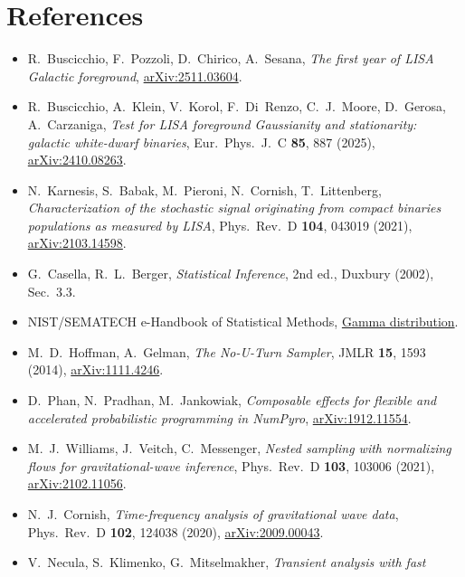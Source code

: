 \documentclass[11pt,a4paper]{article}
\begin{document}
\section*{References}
\begin{itemize}\sloppy
  \item R.~Buscicchio, F.~Pozzoli, D.~Chirico, A.~Sesana, \emph{The first year of LISA
        Galactic foreground},
        \href{https://arxiv.org/abs/2511.03604}{arXiv:2511.03604}.
  \item R.~Buscicchio, A.~Klein, V.~Korol, F.~Di~Renzo, C.~J.~Moore, D.~Gerosa,
        A.~Carzaniga, \emph{Test for LISA foreground Gaussianity and stationarity:
        galactic white-dwarf binaries}, Eur.\ Phys.\ J.\ C \textbf{85}, 887 (2025),
        \href{https://arxiv.org/abs/2410.08263}{arXiv:2410.08263}.
  \item N.~Karnesis, S.~Babak, M.~Pieroni, N.~Cornish, T.~Littenberg,
        \emph{Characterization of the stochastic signal originating from compact
        binaries populations as measured by LISA}, Phys.\ Rev.\ D \textbf{104},
        043019 (2021), \href{https://arxiv.org/abs/2103.14598}{arXiv:2103.14598}.
  \item G.~Casella, R.~L.~Berger, \emph{Statistical Inference}, 2nd ed., Duxbury (2002),
        Sec.~3.3.
  \item NIST/SEMATECH e-Handbook of Statistical Methods,
        \href{https://www.itl.nist.gov/div898/handbook/eda/section3/eda366b.htm}{Gamma distribution}.
  \item M.~D.~Hoffman, A.~Gelman, \emph{The No-U-Turn Sampler}, JMLR \textbf{15}, 1593
        (2014), \href{https://arxiv.org/abs/1111.4246}{arXiv:1111.4246}.
  \item D.~Phan, N.~Pradhan, M.~Jankowiak, \emph{Composable effects for flexible and
        accelerated probabilistic programming in NumPyro},
        \href{https://arxiv.org/abs/1912.11554}{arXiv:1912.11554}.
  \item M.~J.~Williams, J.~Veitch, C.~Messenger, \emph{Nested sampling with normalizing
        flows for gravitational-wave inference}, Phys.\ Rev.\ D \textbf{103}, 103006
        (2021), \href{https://arxiv.org/abs/2102.11056}{arXiv:2102.11056}.
  \item N.~J.~Cornish, \emph{Time-frequency analysis of gravitational wave data},
        Phys.\ Rev.\ D \textbf{102}, 124038 (2020),
        \href{https://arxiv.org/abs/2009.00043}{arXiv:2009.00043}.
  \item V.~Necula, S.~Klimenko, G.~Mitselmakher, \emph{Transient analysis with fast
}
\end{itemize}
\end{document}
